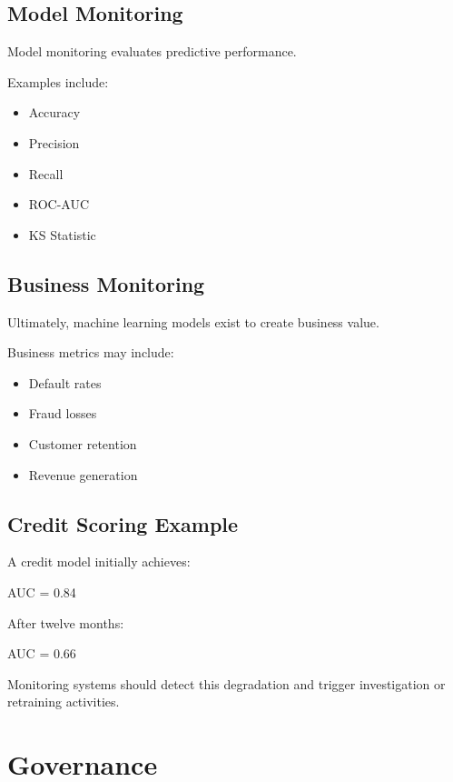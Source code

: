 \subsection{Model Monitoring}

Model monitoring evaluates predictive performance.

Examples include:

\begin{itemize}
    \item Accuracy
    \item Precision
    \item Recall
    \item ROC-AUC
    \item KS Statistic
\end{itemize}

\subsection{Business Monitoring}

Ultimately, machine learning models exist to create business value.

Business metrics may include:

\begin{itemize}
    \item Default rates
    \item Fraud losses
    \item Customer retention
    \item Revenue generation
\end{itemize}

\subsection{Credit Scoring Example}

A credit model initially achieves:

\begin{center}
AUC = 0.84
\end{center}

After twelve months:

\begin{center}
AUC = 0.66
\end{center}

Monitoring systems should detect this degradation and trigger investigation or retraining activities.

\section{Governance}

